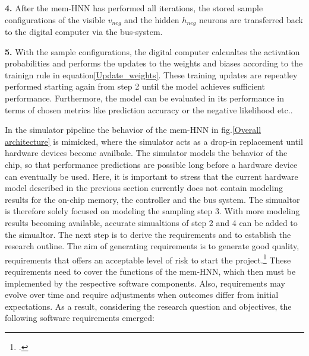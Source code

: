 \textbf{4.} After the \ac{mem-HNN} has performed all iterations, the stored sample configurations
of the visible \(v_{neg}\) and the hidden \(h_{neg}\) neurons are transferred back to the digital computer via the bus-system.

\textbf{5.} With the sample configurations, the digital computer calcualtes the activation probabilities and performs
the updates to the weights and biases according to the trainign rule in equation\ref{Update_weights}.
These training updates are repeatley performed starting again from step 2 until the model achieves sufficient performance.
Furthermore, the model can be evaluated in its performance in terms of chosen metrics like prediction accuracy or the negative likelihood etc..

In the simulator pipeline the behavior of the \ac{mem-HNN} in fig.\ref{Overall architecture} is mimicked, where the simulator acts as a drop-in replacement until hardware devices become availbale.
The simulator models the behavior of the chip, so that performance predictions are possible long before a hardware device can eventually be used.
Here, it is important to stress that the current hardware model described in the previous section currently does not contain modeling results for the on-chip memory, the controller and the bus system.
The simualtor is therefore solely focused on modeling the sampling step 3.
With more modeling results becoming available, accurate simualtions of step 2 and 4 can be added to the simualtor.
The next step is to derive the requirements and to establish the research outline.
The aim of generating requirements is to generate good quality, requirements that offers an acceptable level of risk to start the project.\footcite[cf.][11]{ebertSystematischesRequirementsEngineering2008}
These requirements need to cover the functions of the \ac{mem-HNN}, which then must be implemented by the respective software components.
Also, requirements may evolve over time and require adjustments when outcomes differ from initial expectations.
As a result, considering the research question and objectives, the following software requirements emerged:

